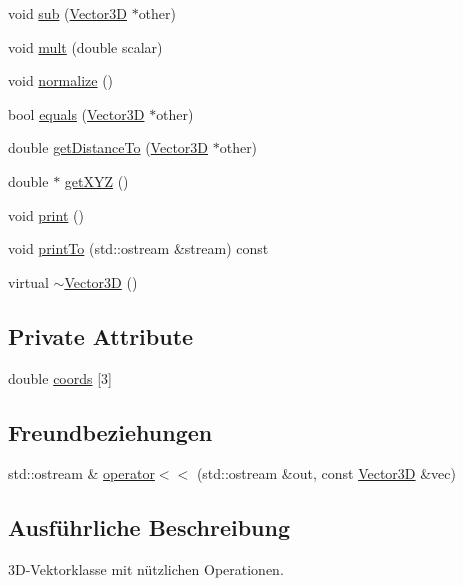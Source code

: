 \begin{DoxyCompactItemize}
\item 
void \hyperlink{classVector3D_a02364a41693ac080f5adadd776df74b4}{sub} (\hyperlink{classVector3D}{Vector3\-D} $\ast$other)
\item 
void \hyperlink{classVector3D_a3dec11494c99de7370e3877054c3ef13}{mult} (double scalar)
\item 
void \hyperlink{classVector3D_abfb12ecb9c9beb88e095cc4a1a512d3c}{normalize} ()
\item 
bool \hyperlink{classVector3D_ac83e936757114f32bc9d868ea5fabbc2}{equals} (\hyperlink{classVector3D}{Vector3\-D} $\ast$other)
\item 
double \hyperlink{classVector3D_a42deb992ec2f44abfb5824ea4917135c}{get\-Distance\-To} (\hyperlink{classVector3D}{Vector3\-D} $\ast$other)
\item 
double $\ast$ \hyperlink{classVector3D_a89aeff2092d6a954cd449aca97c59197}{get\-X\-Y\-Z} ()
\item 
void \hyperlink{classVector3D_a37762d009e092a9a9eecb2de03b6f0ec}{print} ()
\item 
void \hyperlink{classVector3D_a93ebaebe8d2f4f15ef1f79f5fe2cb682}{print\-To} (std\-::ostream \&stream) const 
\item 
virtual \hyperlink{classVector3D_ae4fde5759270bf5bcf615f12f0823a8c}{$\sim$\-Vector3\-D} ()
\end{DoxyCompactItemize}
\subsection*{Private Attribute}
\begin{DoxyCompactItemize}
\item 
double \hyperlink{classVector3D_a1049b9da244f538b5c1f3ac700a776ee}{coords} \mbox{[}3\mbox{]}
\end{DoxyCompactItemize}
\subsection*{Freundbeziehungen}
\begin{DoxyCompactItemize}
\item 
std\-::ostream \& \hyperlink{classVector3D_a948421d7d2b275c202125839e5d7b843}{operator$<$$<$} (std\-::ostream \&out, const \hyperlink{classVector3D}{Vector3\-D} \&vec)
\end{DoxyCompactItemize}


\subsection{Ausführliche Beschreibung}
3\-D-\/\-Vektorklasse mit nützlichen Operationen. 

